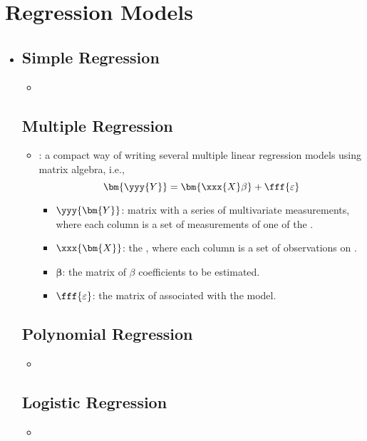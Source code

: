 \section{Regression Models}
\begin{itemize}
  \item [] 
  
  \subsection{Simple Regression}
  \begin{itemize}
    \item 
  \end{itemize}
  
  \subsection{Multiple Regression}
  \begin{itemize}
    \item {}: a compact way of writing several multiple linear regression models using matrix algebra, i.e.,
    \[%
    \bm{\yyy{Y}} = \bm{\xxx{X}\beta} + \fff{\varepsilon}
    \]%
    \begin{itemize}
      \item \(\yyy{\bm{Y}}\): matrix with a series of multivariate measurements, where each column is a set of measurements of one of the .
      \item \(\xxx{\bm{X}}\): the , where each column is a set of observations on .
      \item \(\bm{\beta}\): the matrix of \(\beta \) coefficients to be estimated.
      \item \(\displaystyle\fff{\varepsilon}\): the matrix of  associated with the model.
    \end{itemize}
  \end{itemize}
  
  \subsection{Polynomial Regression}
  \begin{itemize}
    \item 
  \end{itemize}
  
  \subsection{Logistic Regression}
  \begin{itemize}
    \item 
  \end{itemize}


\end{itemize}
